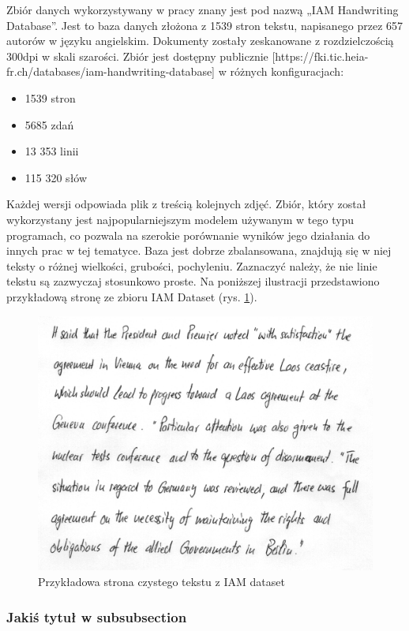 Zbiór danych wykorzystywany w pracy znany jest pod nazwą „IAM Handwriting Database”. Jest to baza danych złożona z 1539 stron tekstu, napisanego przez 657 autorów w języku angielskim. Dokumenty zostały zeskanowane z rozdzielczością 300dpi w skali szarości. Zbiór jest dostępny publicznie [https://fki.tic.heia-fr.ch/databases/iam-handwriting-database] w różnych konfiguracjach:
\begin{itemize}
  \item 1539 stron
  \item 5685 zdań
  \item 13 353 linii
  \item 115 320 słów
\end{itemize}
Każdej wersji odpowiada plik z treścią kolejnych zdjęć. Zbiór, który został wykorzystany jest najpopularniejszym modelem używanym w tego typu programach, co pozwala na szerokie porównanie wyników jego działania do innych prac w tej tematyce.
Baza jest dobrze zbalansowana, znajdują się w niej teksty o różnej wielkości, grubości, pochyleniu. Zaznaczyć należy, że nie linie tekstu są zazwyczaj stosunkowo proste.
Na poniższej ilustracji przedstawiono przykładową stronę ze zbioru IAM Dataset (rys. \ref{fig:IAMexample}).

\begin{figure}[h!]
    \centering
  \includegraphics[width=1\textwidth]{przykladIAM.png}
    \caption{Przykładowa strona czystego tekstu z IAM dataset}
\label{fig:IAMexample}
\end{figure}



\subsubsection{Jakiś tytuł w subsubsection}


